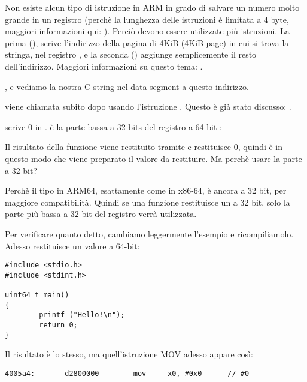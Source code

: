 Non esiste alcun tipo di istruzione in ARM in grado di salvare un numero molto grande in un registro (perchè la lunghezza delle
istruzioni è limitata a 4 byte, maggiori informazioni qui: ).
Perciò devono essere utilizzate più istruzioni. La prima (), scrive l'indirizzo della pagina di 4KiB (4KiB page)
in cui si trova la stringa, nel registro , e la seconda (\ADD) aggiunge semplicemente il resto dell'indirizzo.
Maggiori informazioni su questo tema: .

, e vediamo la nostra C-string  nel  data segment a questo indirizzo.


\puts viene chiamata subito dopo usando l'istruzione . Questo è già stato discusso: .

\MOV scrive 0 in .
 è la parte bassa a 32 bits del registro a 64-bit :



Il risultato della funzione viene restituito tramite  e \main restituisce 0, quindi è in questo modo che viene preparato
il valore da restituire.
Ma perchè usare la parte a 32-bit?

Perchè il tipo \Tint in ARM64, esattamente come in x86-64, è ancora a 32 bit, per maggiore compatibilità.
Quindi se una funzione restituisce un \Tint a 32 bit, solo la parte più bassa a 32 bit del registro  verrà utilizzata.

Per verificare quanto detto, cambiamo leggermente l'esempio e ricompiliamolo.
Adesso \main restituisce un valore a 64-bit:

\begin{lstlisting}[caption=\main che ritorna un valore di tipo \TT{uint64\_t},style=customc]
#include <stdio.h>
#include <stdint.h>

uint64_t main()
{
        printf ("Hello!\n");
        return 0;
}
\end{lstlisting}

Il risultato è lo stesso, ma quell'istruzione MOV adesso appare così:

\begin{lstlisting}[caption=\NonOptimizing GCC 4.8.1 + objdump]
  4005a4:       d2800000        mov     x0, #0x0      // #0
\end{lstlisting}


